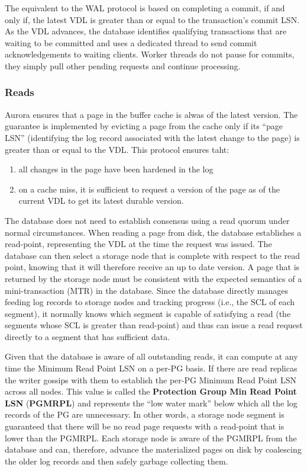 \documentclass[11pt]{article}
\begin{document}
The equivalent to the WAL protocol is based on completing a commit, if and only if, the latest VDL is
greater than or equal to the transaction’s commit LSN. As the VDL advances, the database identifies
qualifying transactions that are waiting to be committed and uses a dedicated thread to send commit
acknowledgements to waiting clients. Worker threads do not pause for commits, they simply pull other
pending requests and continue processing.
\subsubsection{Reads}
\label{sec:orgc80f9fc}
Aurora ensures that a page in the buffer cache is alwas of the latest version. The guarantee is
implemented by evicting a page from the cache only if its “page LSN” (identifying the log record
associated with the latest change to the page) is greater than or equal to the VDL. This protocol
ensures taht:
\begin{enumerate}
\item all changes in the page have been hardened in the log
\item on a cache miss, it is sufficient to request a version of the page as of the current VDL to get its
latest durable version.
\end{enumerate}

The database does not need to establish consensus using a read quorum under normal circumstances. When
reading a page from disk, the database establishes a read-point, representing the VDL at the time the
request was issued. The database can then select a storage node that is complete with respect to the
read point, knowing that it will therefore receive an up to date version. A page that is returned by
the storage node must be consistent with the expected semantics of a mini-transaction (MTR) in the
database. Since the database directly manages feeding log records to storage nodes and tracking
progress (i.e., the SCL of each segment), it normally knows which segment is capable of satisfying a
read (the segments whose SCL is greater than read-point) and thus can issue a read request directly
to a segment that has sufficient data.

Given that the database is aware of all outstanding reads, it can compute at any time the Minimum Read
Point LSN on a per-PG basis. If there are read replicas the writer gossips with them to establish the per-PG Minimum Read Point LSN across all nodes.
This value is called the \textbf{Protection Group Min Read Point LSN} (\textbf{PGMRPL}) and represents the “low water
mark” below which all the log records of the PG are unnecessary. In other words, a storage node
segment is guaranteed that there will be no read page requests with a read-point that is lower than
the PGMRPL. Each storage node is aware of the PGMRPL from the database and can, therefore, advance the
materialized pages on disk by coalescing the older log records and then safely garbage collecting them.
\end{document}
